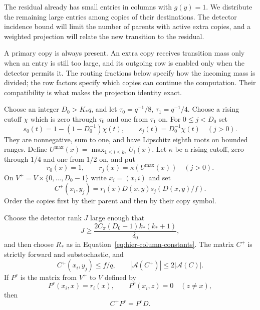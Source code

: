 The residual already has small entries in columns with $g(y)=1$.
We distribute the remaining large entries among copies of their
destinations.  The detector incidence bound will limit the number of
parents with active extra copies, and a weighted projection will relate
the new transition to the residual.

A primary copy is always present. An extra copy receives transition mass only when an entry is still too large, and its outgoing row is enabled only when the detector permits it. The routing fractions below specify how the incoming mass is divided; the row factors specify which copies can continue the computation. Their compatibility is what makes the projection identity exact.

Choose an integer $D_0>K_*q$, and let
$\tau_0=q^{-1}/8$, $\tau_1=q^{-1}/4$.
Choose a rising cutoff $\chi$ which is zero through $\tau_0$ and one
from $\tau_1$ on.  For $0\leq j<D_0$ set
\begin{equation}
 s_0(t)=1-(1-D_0^{-1})\chi(t),\qquad
 s_j(t)=D_0^{-1}\chi(t)\quad(j>0).
 \label{eq:hier-routing-fractions}
\end{equation}
They are nonnegative, sum to one, and have Lipschitz eighth roots on
bounded ranges.  Define $U^{\max}(x)=\max_{1\leq i\leq k_*}U_i(x)$.
Let $\kappa$ be a rising cutoff, zero through $1/4$ and one from
$1/2$ on, and put
\begin{equation}
 r_0(x)=1,\qquad r_j(x)=\kappa(U^{\max}(x))\quad(j>0).
 \label{eq:hier-copy-row-factors}
\end{equation}
On $V^+=V\times\{0,\ldots,D_0-1\}$ write $x_i=(x,i)$ and set
\begin{equation}
 C^+(x_i,y_j)=r_i(x)D(x,y)s_j(D(x,y)/f).
 \label{eq:hier-copy-transition}
\end{equation}
Order the copies first by their parent and then by their copy symbol.

\begin{proposition}
\label{prop:hier-copy-step}
Choose the detector rank $J$ large enough that
\begin{equation}
 J\geq\frac{2C_\pi(D_0-1)k_*(k_*+1)}{\delta_0},
 \label{eq:hier-active-J}
\end{equation}
and then choose $R_*$ as in Equation~\eqref{eq:hier-column-constants}.
The matrix $C^+$ is strictly forward and substochastic, and
\[
 C^+(x_i,y_j)\leq f/q,
 \qquad |\mathcal A(C^+)|\leq2|\mathcal A(C)|.
\]
If $P^r$ is the matrix from $V^+$ to $V$ defined by
\begin{equation}
 P^r(x_i,x)=r_i(x),\qquad
 P^r(x_i,z)=0\quad(z\ne x),
 \label{eq:hier-projection}
\end{equation}
then
\begin{equation}
 C^+P^r=P^rD.
 \label{eq:hier-one-step-intertwining}
\end{equation}
\end{proposition}


